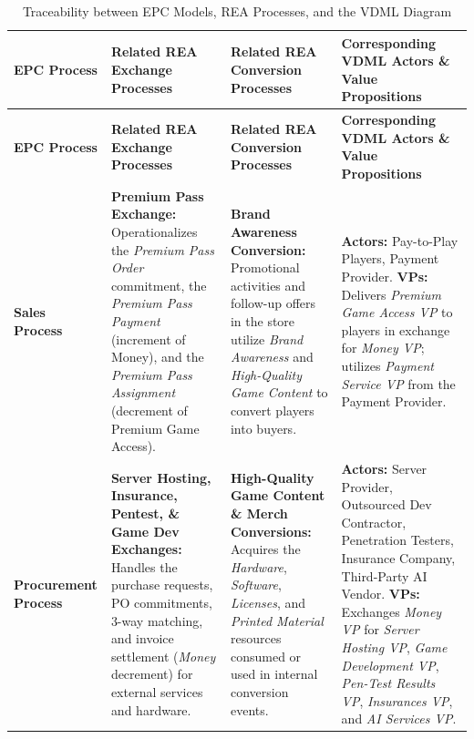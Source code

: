 \documentclass{article}
\begin{document}
{\footnotesize
\setlength{\tabcolsep}{4pt}
\renewcommand{\arraystretch}{1.3}
\begin{longtable}{L{0.16\textwidth} L{0.26\textwidth} L{0.26\textwidth} L{0.26\textwidth}}
    \caption{Traceability between EPC Models, REA Processes, and the VDML Diagram}
    \label{tab:epc-rea-vdml} \\
    \toprule
    \textbf{EPC Process} & \textbf{Related REA Exchange Processes} & \textbf{Related REA Conversion Processes} & \textbf{Corresponding VDML Actors \& Value Propositions} \\
    \midrule
    \endfirsthead

    \toprule
    \textbf{EPC Process} & \textbf{Related REA Exchange Processes} & \textbf{Related REA Conversion Processes} & \textbf{Corresponding VDML Actors \& Value Propositions} \\
    \midrule
    \endhead

    \bottomrule
    \endlastfoot

    \textbf{Sales Process} 
    & \textbf{Premium Pass Exchange:} Operationalizes the \textit{Premium Pass Order} commitment, the \textit{Premium Pass Payment} (increment of Money), and the \textit{Premium Pass Assignment} (decrement of Premium Game Access). 
    & \textbf{Brand Awareness Conversion:} Promotional activities and follow-up offers in the store utilize \textit{Brand Awareness} and \textit{High-Quality Game Content} to convert players into buyers. 
    & \textbf{Actors:} Pay-to-Play Players, Payment Provider.\newline
      \textbf{VPs:} Delivers \textit{Premium Game Access VP} to players in exchange for \textit{Money VP}; utilizes \textit{Payment Service VP} from the Payment Provider. \\
    \midrule

    \textbf{Procurement Process} 
    & \textbf{Server Hosting, Insurance, Pentest, \& Game Dev Exchanges:} Handles the purchase requests, PO commitments, 3-way matching, and invoice settlement (\textit{Money} decrement) for external services and hardware. 
    & \textbf{High-Quality Game Content \& Merch Conversions:} Acquires the \textit{Hardware}, \textit{Software}, \textit{Licenses}, and \textit{Printed Material} resources consumed or used in internal conversion events. 
    & \textbf{Actors:} Server Provider, Outsourced Dev Contractor, Penetration Testers, Insurance Company, Third-Party AI Vendor.\newline
      \textbf{VPs:} Exchanges \textit{Money VP} for \textit{Server Hosting VP}, \textit{Game Development VP}, \textit{Pen-Test Results VP}, \textit{Insurances VP}, and \textit{AI Services VP}. \\
    \midrule


\end{longtable}}
\end{document}
